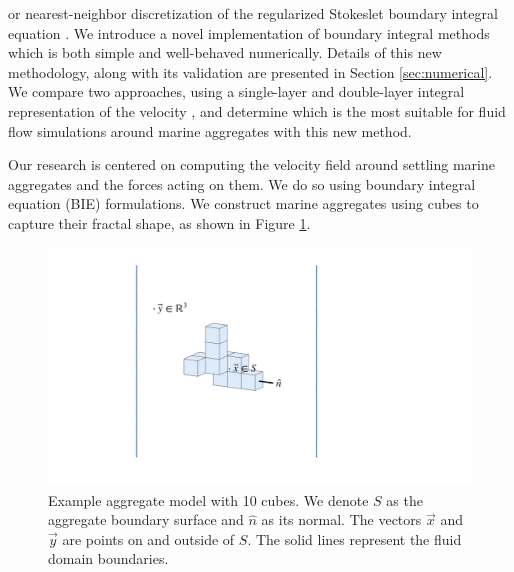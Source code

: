 or  nearest-neighbor discretization of the regularized Stokeslet boundary integral equation \cite{smith_nearest-neighbour_2018}.
 We introduce a novel implementation of boundary integral methods which is both simple  and well-behaved numerically. 
Details of this new methodology, along with its validation are presented in Section \ref{sec:numerical}. We compare two approaches, using a single-layer and double-layer integral representation of the velocity \cite{pozrikidis_boundary_1992, power_second_1987, ingber_comparison_1999}, and determine which is the most suitable for fluid flow simulations around marine aggregates with this new method.


 \par
Our research is centered on computing the velocity field around settling marine aggregates and the forces acting on them. We do so using boundary integral equation (BIE) formulations. We construct marine aggregates using cubes to capture their fractal shape, as shown in Figure \ref{fig_cube10}. 
\begin{figure}[ht]
	\begin{center}
		\includegraphics[scale=0.25]{figures/fig_sample_cube10.pdf}
	\end{center}
	\caption{Example aggregate model with 10 cubes. We denote $S$ as the aggregate boundary surface and $\hat{n}$ as its normal. The vectors $\vec{x}$ and $\vec{y}$ are points on and outside of $S$. The solid lines represent the fluid domain boundaries.}
	\label{fig_cube10}
\end{figure}

